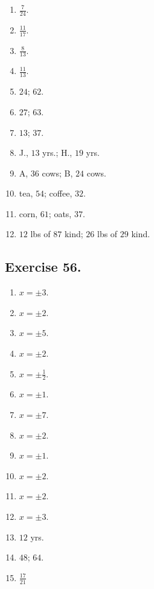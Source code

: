 \documentclass{book}
\begin{document}
\begin{enumerate}
\item $ \frac{7}{24}$.

\item $ \frac{11}{17}$.

\item $\frac{8}{13}$.

\item $\frac{11}{13}$.

\item $24$; $62$.

\item $27$; $63$.

\item $13$; $37$.

\item J., $13$ yrs.; H., $19$ yrs.

\item A, $36$ cows; B, $24$ cows.

\item tea, $54$; coffee, $32$.

\item corn, $61$; oats, $37$.

\item $12$ lbs of $87$ kind; $26$ lbs of $29$ kind.
\end{enumerate}

\subsection*{Exercise 56.}

\begin{enumerate}

\item $x=\pm 3$.

\item $x=\pm 2$.

\item $x=\pm 5$.

\item $x=\pm 2$.

\item $x=\pm \frac{1}{2}$.

\item $x=\pm 1$.

\item $x=\pm 7$.

\item $x=\pm 2$.

\item $x=\pm 1$.

\item $x=\pm 2$.

\item $x=\pm 2$.

\item $x=\pm 3$.

\item $12$ yrs.

\item $48$; $64$.

\item $\frac{17}{21}$
\end{enumerate}
\end{document}
